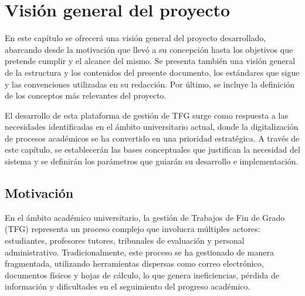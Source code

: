 \documentclass[12pt,a4paper,oneside]{report}
\begin{document}


\renewcommand{\contentsname}{Índice}
\tableofcontents
\newpage

\renewcommand{\listfigurename}{Lista de Figuras}
\listoffigures
\newpage

\markboth{}{}

\setcounter{chapter}{0}

\chapter{Visión general del
proyecto}\label{visiuxf3n-general-del-proyecto}
En este capítulo se ofrecerá una visión general del proyecto
desarrollado, abarcando desde la motivación que llevó a su concepción
hasta los objetivos que pretende cumplir y el alcance del mismo. Se
presenta también una visión general de la estructura y los contenidos
del presente documento, los estándares que sigue y las convenciones
utilizadas en su redacción. Por último, se incluye la definición de los
conceptos más relevantes del proyecto.

El desarrollo de esta plataforma de gestión de TFG surge como respuesta
a las necesidades identificadas en el ámbito universitario actual, donde
la digitalización de procesos académicos se ha convertido en una
prioridad estratégica. A través de este capítulo, se establecerán las
bases conceptuales que justifican la necesidad del sistema y se
definirán los parámetros que guiarán su desarrollo e implementación.

\section{Motivación}\label{motivaciuxf3n}

En el ámbito académico universitario, la gestión de Trabajos de Fin de
Grado (TFG) representa un proceso complejo que involucra múltiples
actores: estudiantes, profesores tutores, tribunales de evaluación y
personal administrativo. Tradicionalmente, este proceso se ha gestionado
de manera fragmentada, utilizando herramientas dispersas como correo
electrónico, documentos físicos y hojas de cálculo, lo que genera
ineficiencias, pérdida de información y dificultades en el seguimiento
del progreso académico.
\end{document}
